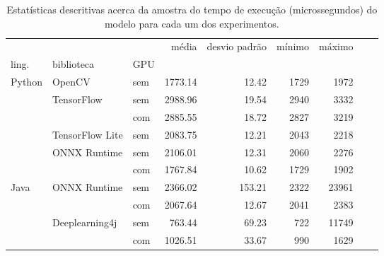 \begin{table}
    \centering
    \begin{tabular}{lllrrrrrr}
        \toprule
               &                 &     & média   & desvio padrão & mínimo & máximo \\
        ling.  & biblioteca      & GPU &         &               &        &        \\
        \midrule
        Python & OpenCV          & sem & 1773.14 & 12.42         & 1729   & 1972   \\
               & TensorFlow      & sem & 2988.96 & 19.54         & 2940   & 3332   \\
               &                 & com & 2885.55 & 18.72         & 2827   & 3219   \\
               & TensorFlow Lite & sem & 2083.75 & 12.21         & 2043   & 2218   \\
               & ONNX Runtime    & sem & 2106.01 & 12.31         & 2060   & 2276   \\
               &                 & com & 1767.84 & 10.62         & 1729   & 1902   \\
        Java   & ONNX Runtime    & sem & 2366.02 & 153.21        & 2322   & 23961  \\
               &                 & com & 2067.64 & 12.67         & 2041   & 2383   \\
               & Deeplearning4j  & sem & 763.44  & 69.23         & 722    & 11749  \\
               &                 & com & 1026.51 & 33.67         & 990    & 1629   \\

        \bottomrule
    \end{tabular}
    \caption{Estatísticas descritivas acerca da amostra do tempo de execução (microssegundos) do modelo para cada um dos experimentos.}
    \label{tab:all}
\end{table}

